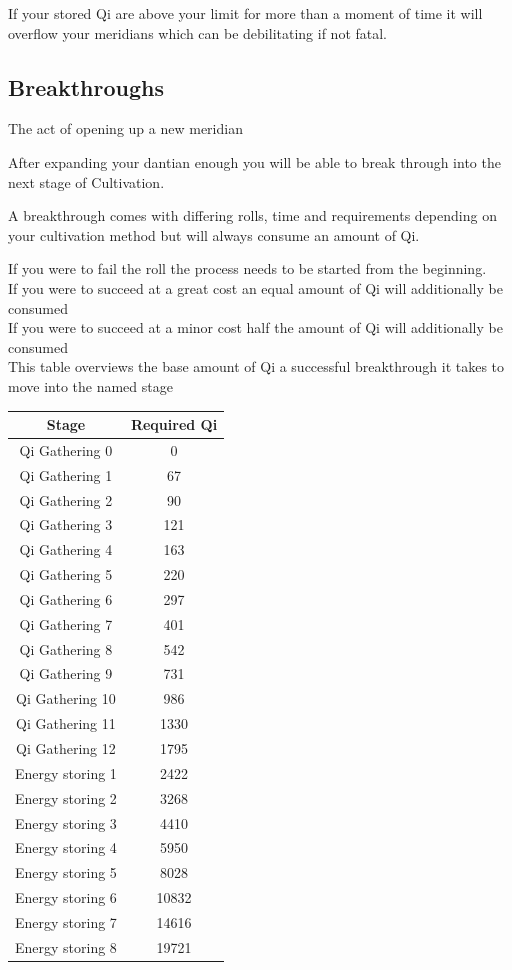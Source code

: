 If your stored Qi are above your limit for more than a moment of time it will overflow your meridians which can be debilitating if not fatal.

\subsection{Breakthroughs}

The act of opening up a new meridian

After expanding your dantian enough you will be able to break through into the next stage of Cultivation. 

A breakthrough comes with differing rolls, time and requirements depending on your cultivation method but will always consume an amount of Qi. 

If you were to fail the roll the process needs to be started from the beginning.\\
If you were to succeed at a great cost an equal amount of Qi will additionally be consumed\\
If you were to succeed at a minor cost half the amount of Qi will additionally be consumed \\
This table overviews the base amount of Qi a successful breakthrough it takes to move into the named stage


\begin{tabular}{|c|c|}
    \hline
    Stage & Required Qi\\
    \hline
    Qi Gathering 0 & 0\\
    Qi Gathering 1 & 67\\
    Qi Gathering 2 & 90\\
    Qi Gathering 3 & 121\\
    Qi Gathering 4 & 163\\
    Qi Gathering 5 & 220\\
    Qi Gathering 6 & 297\\
    Qi Gathering 7 & 401\\
    Qi Gathering 8 & 542\\
    Qi Gathering 9 & 731\\
    Qi Gathering 10 & 986\\
    Qi Gathering 11 & 1330\\
    Qi Gathering 12 & 1795\\
    Energy storing 1 & 2422\\
    Energy storing 2 & 3268\\
    Energy storing 3 & 4410\\
    Energy storing 4 & 5950\\
    Energy storing 5 & 8028\\
    Energy storing 6 & 10832\\
    Energy storing 7 & 14616\\
    Energy storing 8 & 19721\\ 
    \hline     
\end{tabular}


